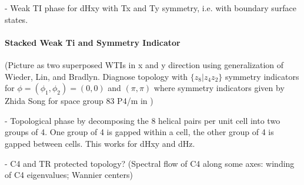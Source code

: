 
{\color{red}- Weak TI phase for dHxy with Tx and Ty symmetry, i.e. with boundary surface states.
\paragraph{Stacked Weak Ti and Symmetry Indicator}
(Picture as two superposed WTIs in x and y direction using generalization of Wieder, Lin, and Bradlyn.  Diagnose topology with $\{ z_8 | z_4 z_2 \}$ symmetry indicators for $\phi = (\phi_1, \phi_2) = (0,0)$ and $(\pi,\pi)$ where symmetry indicators given by Zhida Song for space group 83 P4/m in \cite{MappingSymmetryTopology})

- Topological phase by decomposing the 8 helical pairs per unit cell into two groups of 4. One group of 4 is gapped within a cell, the other group of 4 is gapped between cells. This works for dHxy and dHz.

- C4 and TR protected topology? (Spectral flow of C4 along some axes: winding of C4 eigenvalues; Wannier centers)}





